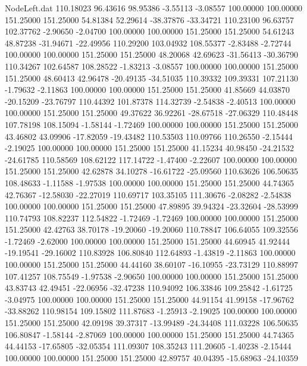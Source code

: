 \begin{filecontents}{NodeLeft.dat}
 110.18023   96.43616   98.95386    -3.55113   -3.08557  100.00000  100.00000  151.25000  151.25000   54.81384   52.29614  -38.37876  -33.34721
 110.23100   96.63757  102.37762    -2.90650   -2.04700  100.00000  100.00000  151.25000  151.25000   54.61243   48.87238  -31.94671  -22.49956
 110.29200  103.04932  108.55377    -2.83488   -2.72744  100.00000  100.00000  151.25000  151.25000   48.20068   42.69623  -31.56413  -30.36790
 110.34267  102.64587  108.28522    -1.83213   -3.08557  100.00000  100.00000  151.25000  151.25000   48.60413   42.96478  -20.49135  -34.51035
 110.39332  109.39331  107.21130    -1.79632   -2.11863  100.00000  100.00000  151.25000  151.25000   41.85669   44.03870  -20.15209  -23.76797
 110.44392  101.87378  114.32739    -2.54838   -2.40513  100.00000  100.00000  151.25000  151.25000   49.37622   36.92261  -28.67518  -27.06329
 110.48448  107.78198  108.15094    -1.58144   -1.72469  100.00000  100.00000  151.25000  151.25000   43.46802   43.09906  -17.82059  -19.43482
 110.53503  110.09766  110.26550    -2.15444   -2.19025  100.00000  100.00000  151.25000  151.25000   41.15234   40.98450  -24.21532  -24.61785
 110.58569  108.62122  117.14722    -1.47400   -2.22607  100.00000  100.00000  151.25000  151.25000   42.62878   34.10278  -16.61722  -25.09560
 110.63626  106.50635  108.48633    -1.11588   -1.97538  100.00000  100.00000  151.25000  151.25000   44.74365   42.76367  -12.58030  -22.27019
 110.69717  103.35105  111.30676    -2.08282   -2.54838  100.00000  100.00000  151.25000  151.25000   47.89895   39.94324  -23.32604  -28.53999
 110.74793  108.82237  112.54822    -1.72469   -1.72469  100.00000  100.00000  151.25000  151.25000   42.42763   38.70178  -19.20060  -19.20060
 110.78847  106.64055  109.32556    -1.72469   -2.62000  100.00000  100.00000  151.25000  151.25000   44.60945   41.92444  -19.19541  -29.16002
 110.83928  106.80840  112.64893    -1.43819   -2.11863  100.00000  100.00000  151.25000  151.25000   44.44160   38.60107  -16.10955  -23.73129
 110.88997  107.41257  108.75549    -1.97538   -2.90650  100.00000  100.00000  151.25000  151.25000   43.83743   42.49451  -22.06956  -32.47238
 110.94092  106.33846  109.25842    -1.61725   -3.04975  100.00000  100.00000  151.25000  151.25000   44.91154   41.99158  -17.96762  -33.88262
 110.98154  109.15802  111.87683    -1.25913   -2.19025  100.00000  100.00000  151.25000  151.25000   42.09198   39.37317  -13.99489  -24.34408
 111.03228  106.50635  106.80847    -1.58144   -2.87069  100.00000  100.00000  151.25000  151.25000   44.74365   44.44153  -17.65805  -32.05354
 111.09307  108.35243  111.20605    -1.40238   -2.15444  100.00000  100.00000  151.25000  151.25000   42.89757   40.04395  -15.68963  -24.10359

\end{filecontents}
